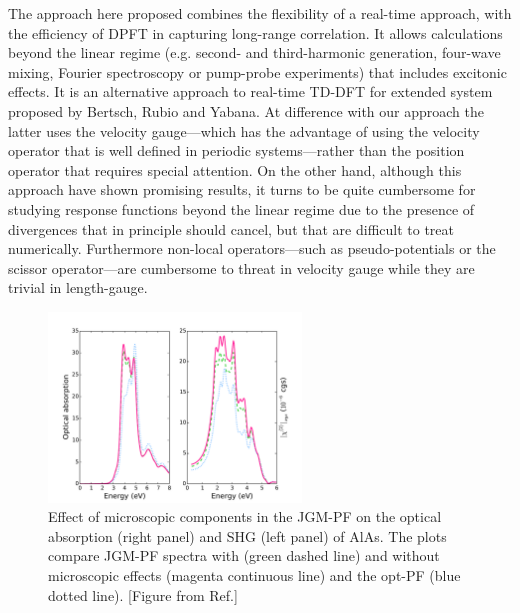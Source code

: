 The approach here proposed combines the flexibility of a real-time approach, with the efficiency of DPFT in capturing long-range correlation. It allows calculations beyond the linear regime (e.g. second- and third-harmonic generation, four-wave mixing, Fourier spectroscopy or pump-probe experiments) that includes excitonic effects. It is an alternative approach to real-time TD-DFT for extended system proposed by Bertsch, Rubio and Yabana.\cite{PhysRevB.62.7998} At difference with our approach the latter uses the velocity gauge---which has the advantage of using the velocity operator that is well defined in periodic systems---rather than the position operator that requires special attention. On the other hand,  although this approach have shown promising results,\cite{PhysRevB.85.045134,goncharov2013nonlinear} it turns to be quite cumbersome for studying response functions beyond the linear regime due to the presence of divergences that in principle should cancel, but that are difficult to treat numerically.\cite{PhysRevB.52.14636} Furthermore non-local operators---such as pseudo-potentials or the scissor operator---are cumbersome to threat in velocity gauge\cite{tokman} while they are trivial in length-gauge.
\begin{figure}[ht]
\centering
\includegraphics[width=0.6\textwidth]{Figures/Geff.pdf}
\caption{\footnotesize{Effect of microscopic components in the JGM-PF on the optical absorption (right panel) and SHG (left panel) of AlAs. The plots compare JGM-PF spectra with (green dashed line) and without microscopic effects (magenta continuous line) and the opt-PF (blue dotted line). [Figure from Ref.\cite{gruningtddf1}] }}
\label{fg:effG}
\end{figure}

